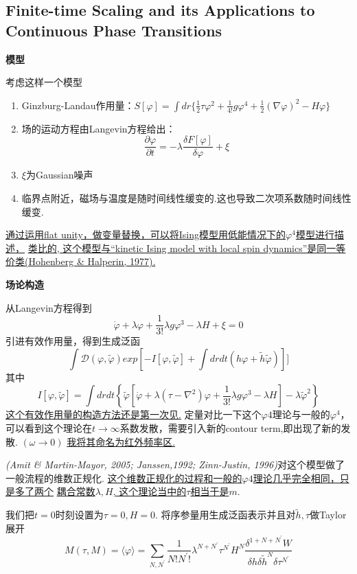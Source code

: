 \documentclass{ctexart}
\begin{document}
\subsection{Finite-time Scaling and its Applications
to Continuous Phase Transitions
}
\textbf{模型}\par 考虑这样一个模型
\begin{enumerate}
\item Ginzburg-Landau作用量：$S[\varphi]=\int dr\{\frac{1}{2}\tau\varphi^2+\frac{1}{4!}g\varphi^4+\frac{1}{2}(\nabla\varphi)^2-H\varphi\}$
\item 场的运动方程由Langevin方程给出：
$$\frac{\partial\varphi}{\partial t}=-\lambda\frac{\delta F[\varphi]}{\delta\varphi}+\xi$$
\item $\xi$为Gaussian噪声
\item 临界点附近，磁场与温度是随时间线性缓变的.这也导致二次项系数随时间线性缓变.
\end{enumerate}
\underline{通过运用flat unity，做变量替换，可以将Ising模型用低能情况下的$\varphi^4$模型进行描述，}\newline 
\underline{类比的, 这个模型与“kinetic Ising model with local spin dynamics”是同一等价类}\newline\underline{(Hohenberg \& Halperin, 1977).}\par 
\textbf{场论构造}\par 
从Langevin方程得到
$$\dot{\varphi}+\lambda \varphi+\frac{1}{3!}\lambda g\varphi^3-\lambda H+\xi=0$$
引进有效作用量，得到生成泛函
$$\int\mathcal{D}(\varphi,\tilde{\varphi})exp[-I[\varphi,\tilde{\varphi}]+\int drdt(h\varphi+\tilde{h}\tilde{\varphi})]]$$
其中
$$I[\varphi,\tilde{\varphi}]=\int drdt\left\{ \tilde{\varphi}[\dot{\varphi}+\lambda(\tau-\nabla^2) \varphi+\frac{1}{3!}\lambda g\varphi^3-\lambda H]-\lambda\tilde{\varphi}^2\right\}$$
\underline{这个有效作用量的构造方法还是第一次见.}
定量对比一下这个$\varphi4$理论与一般的$\varphi^4$，可以看到这个理论在$t\rightarrow \infty$系数发散，需要引入新的contour term,即出现了新的发散.
\underline{$(\omega\rightarrow 0)$}
\underline{我将其命名为红外频率区.}\par
\textit{(Amit \& Martin-Mayor, 2005; Janssen,1992; Zinn-Justin, 1996)}对这个模型做了一般流程的维数正规化. \underline{这个维数正规化的过程和一般的$\varphi4$理论几乎完全相同，只是多了两个}\newline
\underline{耦合常数$\lambda, H$, 这个理论当中的$\tau$相当于是$m$}. 
\par 
我们把$t=0$时刻设置为$\tau=0,H=0.$
将序参量用生成泛函表示并且对$\tilde{h},\tau$做Taylor展开
$$M(\tau, M)=\langle\varphi\rangle=\sum_{N,N^\prime}\frac{1}{N!N^\prime !}\lambda^{N+N^\prime}\tau^{N^\prime}H^N\frac{\delta^{1+N+N^\prime }W}{\delta h\delta\tilde{h}^N\delta\tau^{N^\prime}}$$
\end{document}
